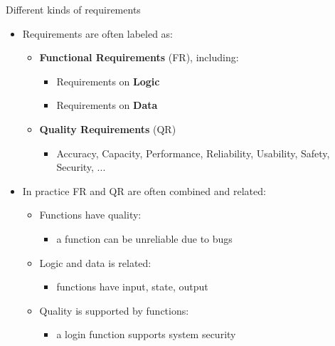 
\begin{Slide}{Different kinds of requirements}

\begin{itemize}
\item Requirements are often labeled as:
\begin{itemize}
\item \textbf{Functional Requirements} (FR), including:
\begin{itemize}
\item Requirements on \textbf{Logic}
\item Requirements on \textbf{Data}
\end{itemize}
\item \textbf{Quality Requirements} (QR)
\begin{itemize}
\item Accuracy, Capacity, Performance, Reliability, Usability, Safety, Security, ...
\end{itemize}
\end{itemize}
\item In practice FR and QR are often combined and related:
\begin{itemize}
\item Functions have quality:
\begin{itemize}
\item a function can be unreliable due to bugs 
\end{itemize}
\item Logic and data is related: 
\begin{itemize}
\item functions have input, state, output
\end{itemize}
\item Quality is supported by functions: 
\begin{itemize}
\item a login function supports system security

\end{itemize}
\end{itemize}
\end{itemize}
\end{Slide}